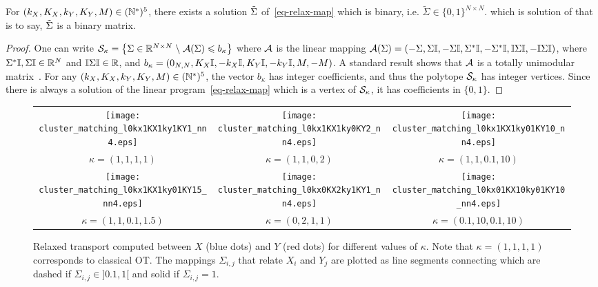 \begin{prop}\label{prop}
	For $(k_X,K_X,k_Y,K_Y,M) \in (\mathbb{N}^*)^5$, there exists a solution  $\tilde{\Sigma}$ of~\eqref{eq-relax-map} which is binary, i.e. $\tilde \Sigma \in \{0,1\}^{N \times N}$.
		which is solution of
	that is to say, $\tilde{\Sigma}$ is a binary matrix.
	\fi
\end{prop}
\begin{proof}
	One can write 
	$\mathcal{S}_\kappa = \left\{  \Sigma \in \mathbb{R}^{N \times N}  \;\backslash\;  \mathcal{A}(\Sigma) \leqslant b_\kappa  \right\}$
	where $\mathcal{A}$ is the linear mapping
	$\mathcal{A}(\Sigma)=(-\Sigma,\Sigma \mathbb{I},-\Sigma \mathbb{I},\Sigma^* \mathbb{I},-\Sigma^* \mathbb{I},\mathbb{I}\Sigma\mathbb{I},-\mathbb{I}\Sigma\mathbb{I})$, where $\Sigma^* \mathbb{I}, \Sigma\mathbb{I} \in \mathbb{R}^{N}$ and $\mathbb{I}\Sigma\mathbb{I} \in \mathbb{R}$, 	and $b_\kappa = (0_{N,N}, K_X\mathbb{I}, -k_X\mathbb{I}, K_Y\mathbb{I}, -k_Y\mathbb{I}, M, -M)$. A standard result shows that $\mathcal{A}$ is a totally unimodular matrix~\cite{schrijver-book}. For any $(k_X,K_X,k_Y,K_Y,M) \in (\mathbb{N}^*)^5$, the vector $b_\kappa$ has integer coefficients, and thus the polytope $\mathcal{S}_\kappa$ has integer vertices. Since there is always a solution of the linear program~\eqref{eq-relax-map} which is a vertex of $\mathcal{S}_\kappa$, it has coefficients in $\{0,1\}$.
\end{proof}
 
 
\begin{figure}
\centering
\begin{tabular}{@{}|@{}c@{}|@{}c@{}|@{}c@{}|}
\hline
\texttt{[image: cluster\_matching\_l0kx1KX1ky1KY1\_nn4.eps]} & 
\texttt{[image: cluster\_matching\_l0kx1KX1ky0KY2\_nn4.eps]} &
\texttt{[image: cluster\_matching\_l0kx1KX1ky01KY10\_nn4.eps]} \\ 
$\kappa=(1,1,1,1)$ & $\kappa=(1,1,0,2)$ & $\kappa=(1,1,0.1,10)$ \\\hline 
\texttt{[image: cluster\_matching\_l0kx1KX1ky01KY15\_nn4.eps]} & 
\texttt{[image: cluster\_matching\_l0kx0KX2ky1KY1\_nn4.eps]} &
\texttt{[image: cluster\_matching\_l0kx01KX10ky01KY10\_nn4.eps]}  \\
  $\kappa=(1,1,0.1,1.5)$ & $\kappa=(0,2,1,1)$  & $\kappa=(0.1,10,0.1,10)$ \\\hline 
\end{tabular}
\caption{\label{im:relaxationk}Relaxed transport computed between $X$ (blue dots) and $Y$ (red dots) for different values of $\kappa$.
Note that $\kappa=(1,1,1,1)$ corresponds to classical OT. The mappings $\Sigma_{i,j}$ that relate $X_i$ and $Y_j$ are plotted as line segments connecting which are dashed if $\Sigma_{i,j} \in ]0.1,1[$  and solid if $\Sigma_{i,j}=1$.  }
\end{figure}

